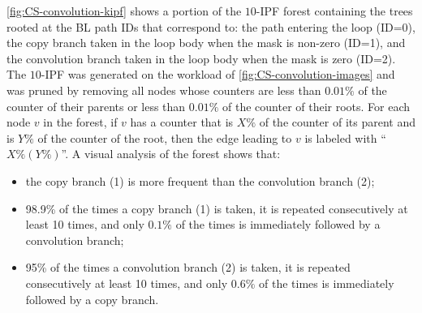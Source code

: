 \myfigure\ref{fig:CS-convolution-kipf} shows a portion of the $10$-IPF forest containing the trees rooted at the BL path IDs that correspond to: the path entering the loop (ID=0), the copy branch taken in the loop body when the mask is non-zero (ID=1), and the convolution branch taken in the loop body when the mask is zero (ID=2). The $10$-IPF was generated on the workload of \myfigure\ref{fig:CS-convolution-images} and was pruned by removing all nodes whose counters are less than $0.01\%$ of the counter of their parents or less than $0.01\%$ of the counter of their roots. For each node $v$ in the forest, if $v$ has a counter that is $X\%$ of the counter of its parent and is $Y\%$ of the counter of the root, then the edge leading to $v$ is labeled with ``$X\% (Y\%)$''. A visual analysis of the forest shows that:
\begin{itemize}[itemsep=0pt,parsep=3pt]
\item the copy branch (1) is more frequent than the convolution branch (2);
\item 98.9\% of the times a copy branch (1) is taken, it is repeated consecutively at least 10 times, and only $0.1\%$ of the times is immediately followed by a convolution branch;
\item 95\% of the times a convolution branch (2) is taken, it is repeated consecutively at least 10 times, and only $0.6\%$ of the times is immediately followed by a copy branch.
\end{itemize}

